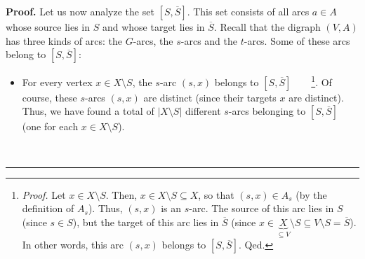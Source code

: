 \documentclass[numbers=enddot,12pt,final,onecolumn,notitlepage]{scrartcl}%
\theoremstyle{definition}
\newenvironment{proof}[1][Proof]{\noindent\textbf{#1.} }{\ \rule{0.5em}{0.5em}}
\begin{document}
\begin{proof}
Let us now analyze the set $\left[  S,\overline{S}\right]  $. This set
consists of all arcs $a\in A$ whose source lies in $S$ and whose target lies
in $\overline{S}$. Recall that the digraph $\left(  V,A\right)  $ has three
kinds of arcs: the $G$-arcs, the $s$-arcs and the $t$-arcs. Some of these arcs
belong to $\left[  S,\overline{S}\right]  $:

\begin{itemize}
\item For every vertex $x\in X\setminus S$, the $s$-arc $\left(  s,x\right)  $
belongs to $\left[  S,\overline{S}\right]  $\ \ \ \ \footnote{\textit{Proof.}
Let $x\in X\setminus S$. Then, $x\in X\setminus S\subseteq X$, so that
$\left(  s,x\right)  \in A_{s}$ (by the definition of $A_{s}$). Thus, $\left(
s,x\right)  $ is an $s$-arc. The source of this arc lies in $S$ (since $s\in
S$), but the target of this arc lies in $\overline{S}$ (since $x\in
\underbrace{X}_{\subseteq V}\setminus S\subseteq V\setminus S=\overline{S}$).
In other words, this arc $\left(  s,x\right)  $ belongs to $\left[
S,\overline{S}\right]  $. Qed.}. Of course, these $s$-arcs $\left(
s,x\right)  $ are distinct (since their targets $x$ are distinct). Thus, we
have found a total of $\left\vert X\setminus S\right\vert $ different $s$-arcs
belonging to $\left[  S,\overline{S}\right]  $ (one for each $x\in X\setminus
S$).


\end{itemize}
\end{proof}
\end{document}
